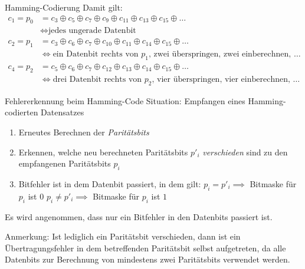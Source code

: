 \begin{defi}{Hamming-Codierung}
    Damit gilt:
    $$
        \begin{aligned}
            c_1 = p_0 & = c_3 \oplus c_5 \oplus c_7 \oplus c_9 \oplus c_{11} \oplus c_{13} \oplus c_{15} \oplus \ldots    \\
                      & \iff \text{jedes ungerade Datenbit}                                                               \\
            c_2 = p_1 & = c_3 \oplus c_6 \oplus c_7 \oplus c_{10} \oplus c_{11} \oplus c_{14} \oplus c_{15} \oplus \ldots \\
                      & \iff \text{ein Datenbit rechts von $p_1$, zwei überspringen, zwei einberechnen, $\ldots$}         \\
            c_4 = p_2 & = c_5 \oplus c_6 \oplus c_7 \oplus c_{12} \oplus c_{13} \oplus c_{14} \oplus c_{15} \oplus \ldots \\
                      & \iff \text{drei Datenbit rechts von $p_2$, vier überspringen, vier einberechnen, $\ldots$}
        \end{aligned}
    $$
\end{defi}

\begin{algo}{Fehlererkennung beim Hamming-Code}
    Situation: Empfangen eines Hamming-codierten Datensatzes

    \begin{enumerate}
        \item Erneutes Berechnen der \emph{Paritätsbits}
        \item Erkennen, welche neu berechneten Paritätsbits $p'_i$ \emph{verschieden} sind zu den empfangenen Paritätsbits $p_i$
        \item Bitfehler ist in dem Datenbit passiert, in dem gilt:
              \subitem $p_i = p'_i \implies$ Bitmaske für $p_i$ ist $0$
              \subitem $p_i \neq p'_i \implies$ Bitmaske für $p_i$ ist $1$
    \end{enumerate}

    Es wird angenommen, dass nur ein Bitfehler in den Datenbits passiert ist.

    Anmerkung: Ist lediglich ein Paritätsbit verschieden, dann ist ein Übertragungsfehler in dem betreffenden Paritätsbit selbst aufgetreten, da alle Datenbits zur Berechnung von mindestens zwei Paritätsbits verwendet werden.
\end{algo}
